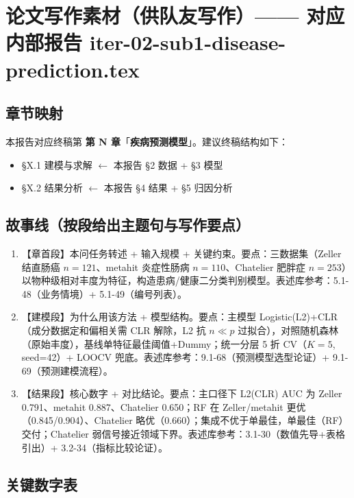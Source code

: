 \documentclass{article}
\begin{document}
\section{论文写作素材（供队友写作）—— 对应内部报告 iter-02-sub1-disease-prediction.tex}

\subsection{章节映射}

本报告对应终稿第 \textbf{第 N 章}「\textbf{疾病预测模型}」。建议终稿结构如下：
\begin{itemize}
  \item §X.1 建模与求解 \quad $\leftarrow$ 本报告 §2 数据 + §3 模型
  \item §X.2 结果分析 \quad $\leftarrow$ 本报告 §4 结果 + §5 归因分析
\end{itemize}

\subsection{故事线（按段给出主题句与写作要点）}

\begin{enumerate}
  \item 【章首段】本问任务转述 + 输入规模 + 关键约束。要点：三数据集（Zeller 结直肠癌 $n=121$、metahit 炎症性肠病 $n=110$、Chatelier 肥胖症 $n=253$）以物种级相对丰度为特征，构造患病/健康二分类判别模型。表述库参考：5.1-48（业务情境）+ 5.1-49（编号列表）。
  \item 【建模段】为什么用该方法 + 模型结构。要点：主模型 Logistic(L2)+CLR（成分数据定和偏相关需 CLR 解除，L2 抗 $n\ll p$ 过拟合），对照随机森林（原始丰度），基线单特征最佳阈值+Dummy；统一分层 5 折 CV（$K=5$, seed=42）+ LOOCV 兜底。表述库参考：9.1-68（预测模型选型论证）+ 9.1-69（预测建模流程）。
  \item 【结果段】核心数字 + 对比结论。要点：主口径下 L2(CLR) AUC 为 Zeller 0.791、metahit 0.887、Chatelier 0.650；RF 在 Zeller/metahit 更优（0.845/0.904）、Chatelier 略优（0.660）；集成不优于单最佳，单最佳（RF）交付；Chatelier 弱信号接近领域下界。表述库参考：3.1-30（数值先导+表格引出）+ 3.2-34（指标比较论证）。
\end{enumerate}

\subsection{关键数字表}
\end{document}
